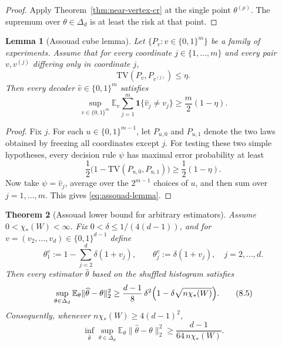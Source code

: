 \documentclass[11pt]{amsart}
\numberwithin{equation}{section}
\newtheorem{theorem}{Theorem}[section]
\newtheorem{lemma}[theorem]{Lemma}
\theoremstyle{definition}
\newcommand{\E}{\mathbb E}
\newcommand{\one}{\mathbf 1}
\newcommand{\TV}{\mathrm{TV}}
\begin{document}
\begin{proof}
Apply Theorem~\ref{thm:near-vertex-cr} at the single point \(\theta^{(\rho)}\).
The supremum over \(\theta\in\Delta_d\) is at least the risk at that point.
\end{proof}

\begin{lemma}[Assouad cube lemma]\label{lem:assouad-cube}
Let \(\{P_v:v\in\{0,1\}^m\}\) be a family of experiments.
Assume that for every coordinate \(j\in\{1,\dots,m\}\) and every pair
\(v,v^{(j)}\) differing only in coordinate \(j\),
\[
\TV(P_v,P_{v^{(j)}})\le \eta.
\]
Then every decoder \(\widehat v\in\{0,1\}^m\) satisfies
\[
\sup_{v\in\{0,1\}^m}
\E_v\sum_{j=1}^m \one\{\widehat v_j\neq v_j\}
\ge
\frac{m}{2}(1-\eta). \tag{8.4}\label{eq:assouad-lemma}
\]
\end{lemma}

\begin{proof}
Fix \(j\).  For each \(u\in\{0,1\}^{m-1}\), let \(P_{u,0}\) and \(P_{u,1}\) denote the two laws obtained by
freezing all coordinates except \(j\).
For testing these two simple hypotheses, every decision rule \(\psi\) has maximal error probability at least
\[
\frac12\bigl(1-\TV(P_{u,0},P_{u,1})\bigr)\ge \frac12(1-\eta).
\]
Now take \(\psi=\widehat v_j\), average over the \(2^{m-1}\) choices of \(u\), and then sum over
\(j=1,\dots,m\).
This gives \eqref{eq:assouad-lemma}.
\end{proof}

\begin{theorem}[Assouad lower bound for arbitrary estimators]\label{thm:assouad-risk}
Assume \(0<\chi_\ast(W)<\infty\).
Fix \(0<\delta\le 1/(4(d-1))\), and for \(v=(v_2,\dots,v_d)\in\{0,1\}^{d-1}\) define
\[
\theta^v_1:=1-\sum_{j=2}^d \delta(1+v_j),
\qquad
\theta^v_j:=\delta(1+v_j),\quad j=2,\dots,d.
\]
Then every estimator \(\widehat\theta\) based on the shuffled histogram satisfies
\[
\sup_{\theta\in\Delta_d}\E_\theta\|\widehat\theta-\theta\|_2^2
\ge
\frac{d-1}{8}\,\delta^2\Bigl(1-\delta\sqrt{n\chi_\ast(W)}\Bigr). \tag{8.5}\label{eq:assouad-risk}
\]
Consequently, whenever \(n\chi_\ast(W)\ge 4(d-1)^2\),
\[
\inf_{\widehat\theta}\sup_{\theta\in\Delta_d}\E_\theta\|\widehat\theta-\theta\|_2^2
\ge
\frac{d-1}{64\,n\chi_\ast(W)}. \tag{8.6}\label{eq:assouad-cor}
\]
\end{theorem}
\end{document}
